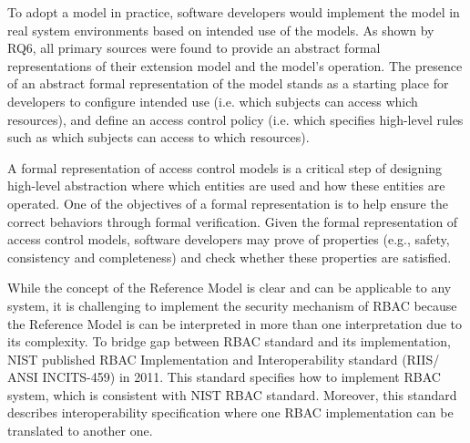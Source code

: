To adopt a model in practice, software developers would implement the model in real system environments based on intended use of the models. 
As shown by RQ6, all primary sources were found to provide an abstract formal representations of their extension model and the model's operation.
The presence of an abstract formal representation of the model stands as a starting place for developers to configure intended use (i.e. which subjects can access which resources), and define an access control policy (i.e. which specifies high-level rules such as which subjects can access to which resources). 

A formal representation of access control models is a critical step of designing high-level abstraction where which entities are used and how these entities are operated.
One of the objectives of a formal representation is to help ensure the correct behaviors through formal verification. 
Given the formal representation of access control models, software developers may prove of properties (e.g., safety, consistency and completeness) and check whether these properties are satisfied. 

While the concept of the Reference Model is clear and can be applicable to any system, it is challenging to implement the security mechanism of RBAC because the Reference Model is can be interpreted in more than one interpretation due to its complexity. 
To bridge gap between RBAC standard and its implementation, NIST published RBAC Implementation and Interoperability standard (RIIS/ ANSI INCITS-459) in 2011. 
This standard specifies how to implement RBAC system, which is consistent with NIST RBAC standard. 
Moreover, this standard describes interoperability specification where one RBAC implementation can be translated to another one.

